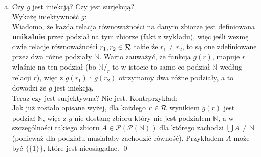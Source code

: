 \documentclass[10pt]{article}
\newcommand{\N}{\mathbb{N}}
\newcommand{\Pows}{\mathcal{P}}
\begin{document}
\begin{enumerate}[a)]
    \item Czy $g$ jest iniekcją? Czy jest surjekcją? \\[10pt]
    Wykażę iniektywność $g$: \\[5pt]
    Wiadomo, że każda relacja równoważności na danym zbiorze jest definiowana \textbf{unikalnie} przez podział na tym zbiorze (fakt z wykładu), więc jeśli wezmę dwie relacje równoważności $r_1, r_2 \in \mathcal{R}$ takie że $r_1 \neq r_2$, to są one zdefiniowane przez dwa różne podziały $\N$. Warto zauważyć, że funkcja $g(r)$, mapuje $r$ właśnie na ten podział (bo $\N /_r$ to w istocie to samo co podział $\N$ według relacji $r$), więc z $g(r_1)$ i $g(r_2)$ otrzymamy dwa różne podziały, a to dowodzi że $g$ jest iniekcją. \\[10pt]
    Teraz czy jest surjektywna? Nie jest. Kontrprzykład: \\[5pt]
    Jak już zostało opisane wyżej, dla każdego $r \in \mathcal{R}$ wynikiem $g(r)$ jest podział $\N$, więc z $g$ nie dostanę zbioru który nie jest podziałem $\N$, a w szczególności takiego zbioru $A \in \Pows(\Pows(\N))$ dla którego zachodzi $\bigcup A \neq \N$ (ponieważ dla podziału musiałaby zachodzić równość). Przykładem $A$ może być $\{\{1\}\}$, które jest nieosiągalne. \qed


\end{enumerate}
\end{document}
